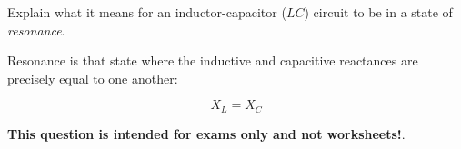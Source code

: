 

Explain what it means for an inductor-capacitor ($LC$) circuit to be in a state of {\it resonance}.

\vskip 30pt







Resonance is that state where the inductive and capacitive reactances are precisely equal to one another:

$$X_L = X_C$$







{\bf This question is intended for exams only and not worksheets!}.



